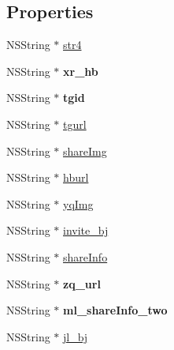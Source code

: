 \subsection*{Properties}
\begin{DoxyCompactItemize}
\item 
N\+S\+String $\ast$ \mbox{\hyperlink{interface_j_m_invite_friend_model_a3772dfb6e7a8e2616d682bd87e280900}{str4}}
\item 
\mbox{\label{interface_j_m_invite_friend_model_ab9e428a8186577c777c9ca10ea1c8d95}} 
N\+S\+String $\ast$ {\bfseries xr\+\_\+hb}
\item 
\mbox{\label{interface_j_m_invite_friend_model_a47d5029b06c34cb5ad6834f8bee40d92}} 
N\+S\+String $\ast$ {\bfseries tgid}
\item 
N\+S\+String $\ast$ \mbox{\hyperlink{interface_j_m_invite_friend_model_a8ab67466d09090735bb19b388c62f7e9}{tgurl}}
\item 
N\+S\+String $\ast$ \mbox{\hyperlink{interface_j_m_invite_friend_model_a2442047258ef8a80b3905d13eaacb3b3}{share\+Img}}
\item 
N\+S\+String $\ast$ \mbox{\hyperlink{interface_j_m_invite_friend_model_a72d16b2a5f953e5a0fe96015e39f2751}{hburl}}
\item 
N\+S\+String $\ast$ \mbox{\hyperlink{interface_j_m_invite_friend_model_a8cf9dc0387ed89539331932413890467}{yq\+Img}}
\item 
N\+S\+String $\ast$ \mbox{\hyperlink{interface_j_m_invite_friend_model_aa7d1b20734b0a9addfe8c739968a0156}{invite\+\_\+bj}}
\item 
N\+S\+String $\ast$ \mbox{\hyperlink{interface_j_m_invite_friend_model_af7061a502e29274acdad658776def6e3}{share\+Info}}
\item 
\mbox{\label{interface_j_m_invite_friend_model_aac208900cb6cfd3f6a255b38496d51ca}} 
N\+S\+String $\ast$ {\bfseries zq\+\_\+url}
\item 
\mbox{\label{interface_j_m_invite_friend_model_a25ef45bbf595d23b60c539703845005f}} 
N\+S\+String $\ast$ {\bfseries ml\+\_\+share\+Info\+\_\+two}
\item 
N\+S\+String $\ast$ \mbox{\hyperlink{interface_j_m_invite_friend_model_a9bfddc7942163bd7849b4297c8f2510e}{jl\+\_\+bj}}
\item 

\end{DoxyCompactItemize}
